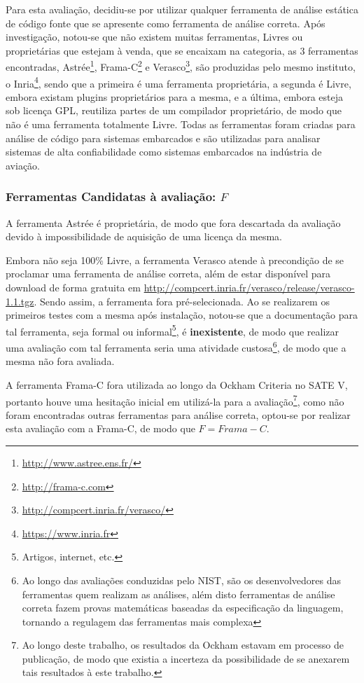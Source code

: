 Para esta avaliação, decidiu-se por utilizar qualquer ferramenta de análise estática de código fonte que se apresente como ferramenta de análise correta. Após investigação, notou-se que não existem muitas ferramentas, Livres ou proprietárias que estejam à venda, que se encaixam na categoria, as 3 ferramentas encontradas, Astrée\footnote{\url{http://www.astree.ens.fr/}}, Frama-C\footnote{\url{http://frama-c.com}} e Verasco\footnote{\url{http://compcert.inria.fr/verasco/}}, são produzidas pelo mesmo instituto, o Inria\footnote{\url{https://www.inria.fr}}, sendo que a primeira é uma ferramenta proprietária, a segunda é Livre, embora existam plugins proprietários para a mesma, e a última, embora esteja sob licença GPL, reutiliza partes de um compilador proprietário, de modo que não é uma ferramenta totalmente Livre. Todas as ferramentas foram criadas para análise de código para sistemas embarcados e são utilizadas para analisar sistemas de alta confiabilidade como sistemas embarcados na indústria de aviação.

\subsubsection{Ferramentas Candidatas à avaliação: $F$}

A ferramenta Astrée é proprietária, de modo que fora descartada da avaliação devido à impossibilidade de aquisição de uma licença da mesma.

Embora não seja 100\% Livre, a ferramenta Verasco atende à precondição de se proclamar uma ferramenta de análise correta, além de estar disponível para download de forma gratuita em \url{http://compcert.inria.fr/verasco/release/verasco-1.1.tgz}. Sendo assim, a ferramenta fora pré-selecionada. Ao se realizarem os primeiros testes com a mesma após instalação, notou-se que a documentação para tal ferramenta, seja formal ou informal\footnote{Artigos, internet, etc.}, é \textbf{inexistente}, de modo que realizar uma avaliação com tal ferramenta seria uma atividade custosa\footnote{Ao longo das avaliações conduzidas pelo NIST, são os desenvolvedores das ferramentas quem realizam as análises, além disto ferramentas de análise correta fazem provas matemáticas baseadas da especificação da linguagem, tornando a regulagem das ferramentas mais complexa}, de modo que a mesma não fora avaliada.

A ferramenta Frama-C fora utilizada ao longo da Ockham Criteria no SATE V, portanto houve uma hesitação inicial em utilizá-la para a avaliação\footnote{Ao longo deste trabalho, os resultados da Ockham estavam em processo de publicação, de modo que existia a incerteza da possibilidade de se anexarem tais resultados à este trabalho.}, como não foram encontradas outras ferramentas para análise correta, optou-se por realizar esta avaliação com a Frama-C, de modo que
$F = {Frama-C}$.


